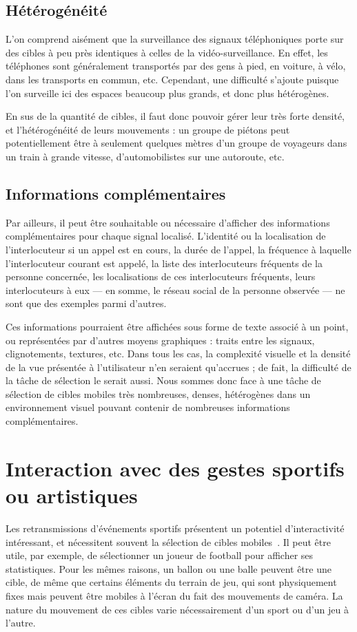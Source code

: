 	\subsection{Hétérogénéité}
	L'on comprend aisément que la surveillance des signaux téléphoniques porte sur des cibles à peu près identiques à celles de la vidéo-surveillance. En effet, les téléphones sont généralement transportés par des gens à pied, en voiture, à vélo, dans les transports en commun, etc. Cependant, une difficulté s'ajoute puisque l'on surveille ici des espaces beaucoup plus grands, et donc plus hétérogènes.
	
	En sus de la quantité de cibles, il faut donc pouvoir gérer leur très forte densité, et l'hétérogénéité de leurs mouvements : un groupe de piétons peut potentiellement être à seulement quelques mètres d'un groupe de voyageurs dans un train à grande vitesse, d'automobilistes sur une autoroute, etc.
	
	\subsection{Informations complémentaires}
	Par ailleurs, il peut être souhaitable ou nécessaire d'afficher des informations complémentaires pour chaque signal localisé. L'identité ou la localisation de l'interlocuteur si un appel est en cours, la durée de l'appel, la fréquence à laquelle l'interlocuteur courant est appelé, la liste des interlocuteurs fréquents de la personne concernée, les localisations de ces interlocuteurs fréquents, leurs interlocuteurs à eux — en somme, le réseau social de la personne observée — ne sont que des exemples parmi d'autres.
	
	Ces informations pourraient être affichées sous forme de texte associé à un point, ou représentées par d'autres moyens graphiques : traits entre les signaux, clignotements, textures, etc. Dans tous les cas, la complexité visuelle et la densité de la vue présentée à l'utilisateur n'en seraient qu'accrues ; de fait, la difficulté de la tâche de sélection le serait aussi. Nous sommes donc face à une tâche de sélection de cibles mobiles très nombreuses, denses, hétérogènes dans un environnement visuel pouvant contenir de nombreuses informations complémentaires.
	
	\section{Interaction avec des gestes sportifs ou artistiques}
	Les retransmissions d'événements sportifs présentent un potentiel d'interactivité intéressant, et nécessitent souvent la sélection de cibles mobiles~\cite{ilich2010moving}. Il peut être utile, par exemple, de sélectionner un joueur de football pour afficher ses statistiques. Pour les mêmes raisons, un ballon ou une balle peuvent être une cible, de même que certains éléments du terrain de jeu, qui sont physiquement fixes mais peuvent être mobiles à l'écran du fait des mouvements de caméra. La nature du mouvement de ces cibles varie nécessairement d'un sport ou d'un jeu à l'autre.
	

